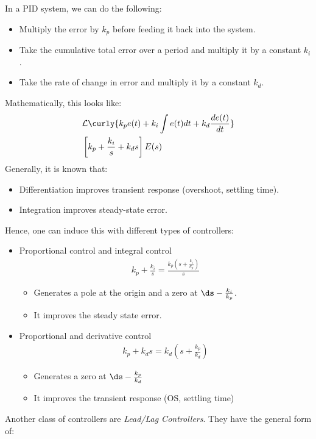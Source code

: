 \documentclass{article}
\begin{document}
\gap
In a PID system, we can do the following:
\begin{itemize}
\item Multiply the error by $k_p$ before feeding it back into the system.
\item Take the cumulative total error over a period and multiply it by a constant $k_i$.
\item Take the rate of change in error and multiply it by a constant $k_d$.
\end{itemize}
Mathematically, this looks like:
\begin{align*}
  &\mathcal{L} \curly{k_p e(t) + k_i \int e(t) dt + k_d \frac{de(t)}{dt}}\\
  &\left[k_p + \frac{k_i}{s} + k_d s\right]E(s)
\end{align*}
Generally, it is known that:
\begin{itemize}
\item Differentiation improves transient response (overshoot, settling time).
\item Integration improves steady-state error.
\end{itemize}
Hence, one can induce this with different types of controllers:
\begin{itemize}
\item {} Proportional control and integral control
  \begin{align*}
    k_p + \frac{k_i}{s} = \frac{k_p \left(s + \frac{k_i}{k_p}\right)}{s}
  \end{align*}
  \begin{itemize}
  \item Generates a pole at the origin and a zero at $\ds -\frac{k_i}{k_p}$.
  \item It improves the steady state error.
  \end{itemize}
\item {} Proportional and derivative control
  \begin{align*}
    k_p + k_ds = k_d \left(s + \frac{k_p}{k_d}\right)
  \end{align*}
  \begin{itemize}
  \item Generates a zero at $\ds -\frac{k_p}{k_d}$
  \item It improves the transient response (OS, settling time)
  \end{itemize}
\end{itemize}
Another class of controllers are \textit{Lead/Lag Controllers}. They have the general form of:
\end{document}
